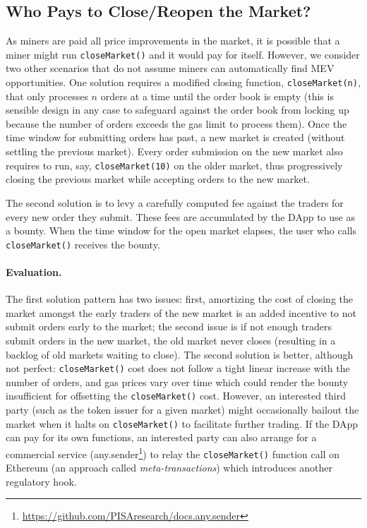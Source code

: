
\subsection{Who Pays to Close/Reopen the Market?}
\label{sec:close}

As miners are paid all price improvements in the market, it is possible that a miner might run \texttt{closeMarket()} and it would pay for itself. However, we consider two other scenarios that do not assume miners can automatically find MEV opportunities. One solution requires a modified closing function, \texttt{closeMarket(n)}, that only processes $n$ orders at a time until the order book is empty (this is sensible design in any case to safeguard against the order book from locking up because the number of orders exceeds the gas limit to process them).  Once the time window for submitting orders has past, a new market is created (without settling the previous market). Every order submission on the new market also requires to run, say, \texttt{closeMarket(10)} on the older market, thus progressively closing the previous market while accepting orders to the new market. 

The second solution is to levy a carefully computed fee against the traders for every new order they submit. These fees are accumulated by the DApp to use as a bounty. When the time window for the open market elapses, the user who calls \texttt{closeMarket()} receives the bounty. 

\paragraph{Evaluation.} The first solution pattern has two issues: first, amortizing the cost of closing the market amongst the early traders of the new market is an added incentive to not submit orders early to the market; the second issue is if not enough traders submit orders in the new market, the old market never closes (resulting in a backlog of old markets waiting to close). The second solution is better, although not perfect: \texttt{closeMarket()} cost does not follow a tight linear increase with the number of orders, and gas prices vary over time which could render the bounty insufficient for offsetting the \texttt{closeMarket()} cost. However, an interested third party (such as the token issuer for a given market) might occasionally bailout the market when it halts on \texttt{closeMarket()} to facilitate further trading. If the DApp can pay for its own functions, an interested party can also arrange for a commercial service (\eg any.sender\footnote{\url{https://github.com/PISAresearch/docs.any.sender}}) to relay the \texttt{closeMarket()} function call on Ethereum (an approach called \textit{meta-transactions}) which introduces another regulatory hook.

